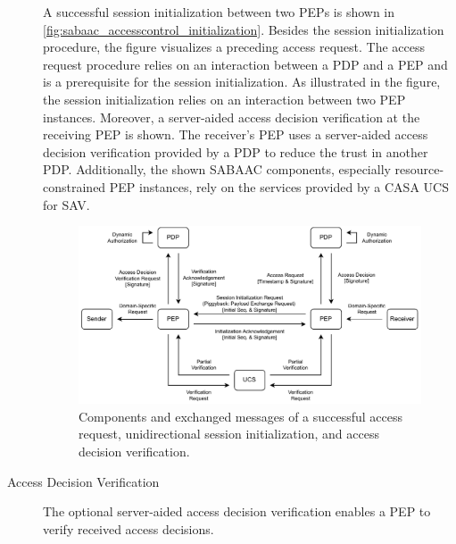 \begin{description}
    A successful session initialization between two PEPs is shown in \autoref{fig:sabaac_accesscontrol_initialization}.
    Besides the session initialization procedure, the figure visualizes a preceding access request.
    The access request procedure relies on an interaction between a PDP and a PEP and is a prerequisite for the session initialization.
    As illustrated in the figure, the session initialization relies on an interaction between two PEP instances.
    Moreover, a server-aided access decision verification at the receiving PEP is shown.
    The receiver's PEP uses a server-aided access decision verification provided by a PDP to reduce the trust in another PDP.
    Additionally, the shown SABAAC components, especially resource-constrained PEP instances, rely on the services provided by a CASA UCS for SAV.
    \begin{figure}
        \centering
        \includegraphics[width=1.0\linewidth]{figures/SABAAC_protocols_accesscontrol_initialization.drawio.pdf}
        \caption{Components and exchanged messages of a successful access request, unidirectional session initialization, and access decision verification.
        }
        \label{fig:sabaac_accesscontrol_initialization}
    \end{figure}
    \item[Access Decision Verification] The optional server-aided access decision verification enables a PEP to verify received access decisions.

\end{description}
